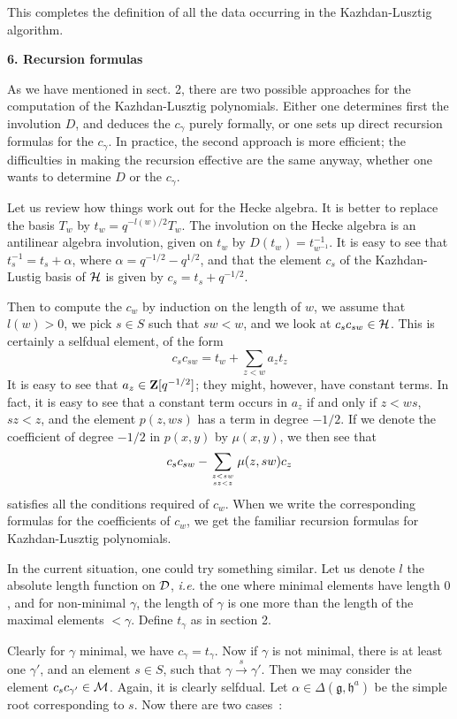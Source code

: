\documentclass[11 pt]{article}
\def\ra{\rightarrow}
\def\rao#1{\overset{#1}\ra}
\def\1{^{-1}}
\def\a{\alpha}
\def\D{{\cal D}}
\def\g{\gamma}
\def\gf{{\mathfrak g}}
\def\Hc{{\cal H}}
\def\hf{{\mathfrak h}}
\def\M{{\cal M}}
\def\qmh{q^{-1/2}}
\def\Z{{\bf Z}}
\begin{document}
\medskip

This completes the definition of all the data occurring in the Kazhdan-Lusztig
algorithm.

\bigskip

\noindent\textbf{6. Recursion formulas}

\medskip

As we have mentioned in sect. 2, there are two possible approaches for the
computation of the Kazhdan-Lusztig polynomials. Either one determines first
the involution $D$, and deduces the $c_\g$ purely formally, or one sets up
direct recursion formulas for the $c_\g$. In practice, the second approach
is more efficient; the difficulties in making the recursion effective are the 
same anyway, whether one wants to determine $D$ or the $c_\g$.

\medskip

Let us review how things work out for the Hecke algebra. It is better to
replace the basis $T_w$ by $t_w=q^{-l(w)/2}T_w$. The involution on the
Hecke algebra is an antilinear algebra involution, given on $t_w$ by
$D(t_w)=t_{w\1}\1$. It is easy to see that $t_s\1=t_s+\a$, where
$\a=q^{-1/2}-q^{1/2}$, and that the element $c_s$ of the Kazhdan-Lustig
basis of $\Hc$ is given by $c_s=t_s+\qmh$.

Then to compute the $c_w$ by induction on the length of $w$, we assume
that $l(w)>0$, we pick $s\in S$ such that $sw<w$, and we look at 
$c_sc_{sw}\in\Hc$. This is certainly a selfdual element, of the form
$$
c_sc_{sw}=t_w+\sum_{z<w}a_zt_z
$$
It is easy to see that $a_z\in\Z[\qmh]$; they might, however, have constant
terms. In fact, it is easy to see that a constant term occurs in $a_z$ if
and only if $z<ws$, $sz<z$, and the element $p(z,ws)$ has a term in degree
$-1/2$. If we denote the coefficient of degree $-1/2$ in $p(x,y)$ by 
$\mu(x,y)$, we then see that
$$
c_sc_{sw}-\sum_{z<sw\atop sz<z}\mu(z,sw)c_z
$$
satisfies all the conditions required of $c_w$. When we write the corresponding
formulas for the coefficients of $c_w$, we get the familiar recursion formulas
for Kazhdan-Lusztig polynomials.

\medskip

In the current situation, one could try something similar. Let us denote $l$
the absolute length function on $\D$, {\em i.e.} the one where minimal elements
have length $0$, and for non-minimal $\g$, the length of $\g$ is one more than
the length of the maximal elements $<\g$. Define $t_\g$ as in section 2.

Clearly for $\g$ minimal, we have $c_\g=t_\g$. Now if $\g$ is not minimal,
there is at least one $\g'$, and an element $s\in S$, such that $\g\rao s\g'$.
Then we may consider the element $c_sc_{\g'}\in \M$. Again, it is clearly 
selfdual. Let $\a\in\Delta(\gf,\hf^a)$ be the simple root corresponding to
$s$. Now there are two cases~:
\end{document}
